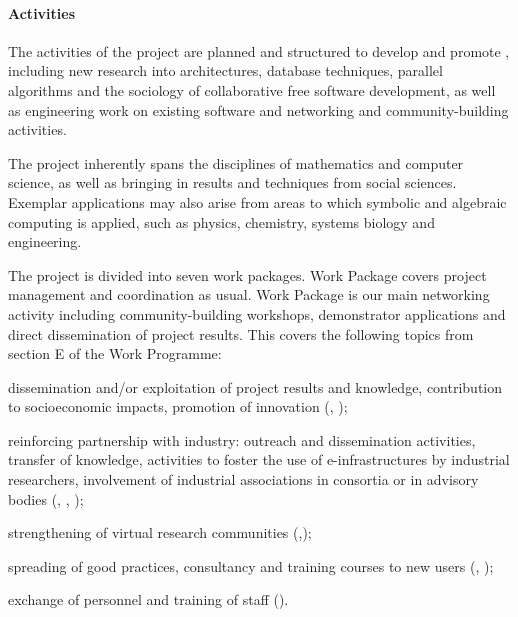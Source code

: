 \paragraph{Activities}

The activities of the project are planned and structured to develop
and promote \TheProject, including new research into
architectures, database techniques, parallel algorithms and the
sociology of collaborative free software development, as well as
engineering work on existing software and networking and
community-building activities.

The project inherently spans the disciplines of mathematics and
computer science, as well as bringing in results and techniques from
social sciences. Exemplar applications may also arise from areas to
which symbolic and algebraic computing is applied, such as physics,
chemistry, systems biology and engineering.


The project is divided into seven work packages. Work Package
 covers project management and coordination as
usual. Work Package  is our main networking activity
including community-building workshops, demonstrator applications and
direct dissemination of project results.
This covers the following topics from section E of the Work Programme:
\begin{compactitem}
\item dissemination and/or exploitation of project results and
  knowledge, contribution to socioeconomic impacts, promotion of
  innovation (,
  );
\item reinforcing partnership with industry: outreach and
  dissemination activities, transfer of knowledge, activities to
  foster the use of e-infrastructures by industrial researchers,
  involvement of industrial associations in consortia or in advisory
  bodies (,
  , );
\item strengthening of virtual research communities
  (,);
\item spreading of good practices, consultancy and training courses to
  new users (,
  );
\item exchange of personnel and training of staff
  ().
\end{compactitem}



